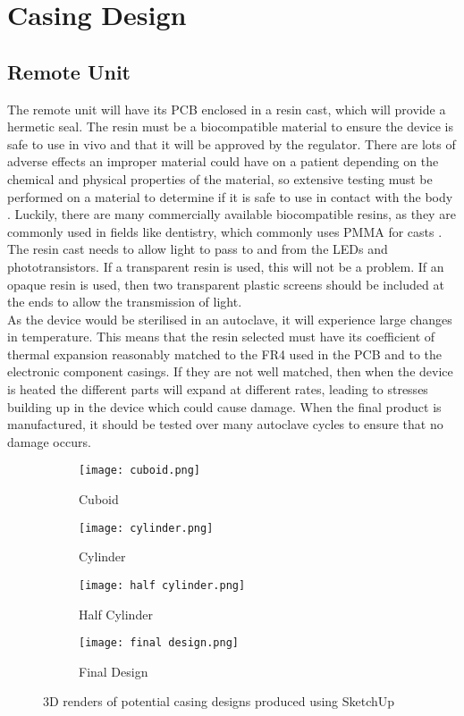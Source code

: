 \section{Casing Design}

\subsection{Remote Unit}
The remote unit will have its PCB enclosed in a resin cast, which will provide a hermetic seal. The resin must be a biocompatible material to ensure the device is safe to use in vivo and that it will be approved by the regulator. There are lots of adverse effects an improper material could have on a patient depending on the chemical and physical properties of the material, so extensive testing must be performed on a material to determine if it is safe to use in contact with the body \cite{biocompatible_tests}. Luckily, there are many commercially available biocompatible resins, as they are commonly used in fields like dentistry, which commonly uses PMMA for casts \cite{biocompatible_resin}. The resin cast needs to allow light to pass to and from the LEDs and phototransistors. If a transparent resin is used, this will not be a problem. If an opaque resin is used, then two transparent plastic screens should be included at the ends to allow the transmission of light.\\

As the device would be sterilised in an autoclave, it will experience large changes in temperature. This means that the resin selected must have its coefficient of thermal expansion reasonably matched to the FR4 used in the PCB and to the electronic component casings. If they are not well matched, then when the device is heated the different parts will expand at different rates, leading to stresses building up in the device which could cause damage. When the final product is manufactured, it should be tested over many autoclave cycles to ensure that no damage occurs.\\

\begin{figure}[htb]
	\centering
	\begin{subfigure}[b]{0.4\linewidth}
		\texttt{[image: cuboid.png]}
		\caption{Cuboid}
		\label{fig: cuboid}
	\end{subfigure}
	\begin{subfigure}[b]{0.4\linewidth}
		\texttt{[image: cylinder.png]}
		\caption{Cylinder}
		\label{fig: cylinder}
	\end{subfigure}
	\begin{subfigure}[b]{0.4\linewidth}
		\texttt{[image: half cylinder.png]}
		\caption{Half Cylinder}
		\label{fig: half cylinder}
	\end{subfigure}
	\begin{subfigure}[b]{0.4\linewidth}
		\texttt{[image: final design.png]}
		\caption{Final Design}
		\label{fig: final design}
	\end{subfigure}
	\caption{3D renders of potential casing designs produced using SketchUp \cite{sketchup}}
	\label{fig: casings}
\end{figure}

